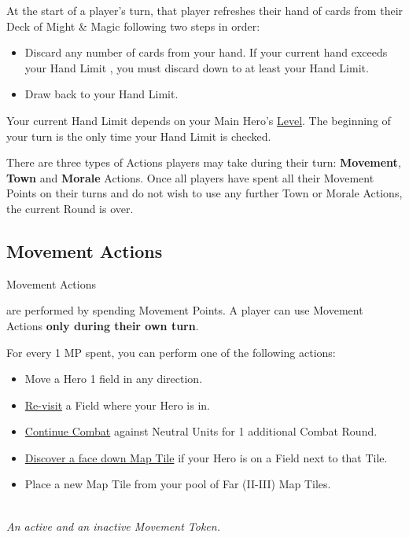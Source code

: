 
\begin{multicols*}{2}

At the start of a player's turn, that player refreshes their hand of cards from their Deck of Might \& Magic following two steps in order:
\begin{itemize}
  \item Discard any number of cards from your hand.
If your current hand exceeds your Hand Limit , you must discard down to at least your Hand Limit.
  \item Draw back to your Hand Limit.
\end{itemize}
Your current Hand Limit depends on your Main Hero's \hyperlink{Level}{Level}.
The beginning of your turn is the only time your Hand Limit is checked.\par
There are three types of Actions players may take during their turn: \textbf{Movement}, \textbf{Town} and \textbf{Morale} Actions.
Once all players have spent all their Movement Points on their turns and do not wish to use any further Town or Morale Actions, the current Round is over.
\subsection*{Movement Actions}
\hypertarget{Movement}{Movement Actions} are performed by spending Movement Points.
A player can use Movement Actions \textbf{only during their own turn}.\par
For every 1 MP spent, you can perform one of the following actions:
\begin{itemize}
  \item Move a Hero 1 field in any direction.
  \item \hyperlink{Categories}{Re-visit} a Field where your Hero is in.
  \item \hyperlink{Timelimit}{Continue Combat} against Neutral Units for 1 additional Combat Round.
  \item \hyperlink{Placing}{Discover a face down Map Tile} if your Hero is on a Field next to that Tile.
  \item Place a new Map Tile from your pool of Far (II-III) Map Tiles.
\end{itemize}

\begin{center}
  \\
  \medskip
  \footnotesize\textit{An active and an inactive Movement Token.}
\end{center}


\end{multicols*}
